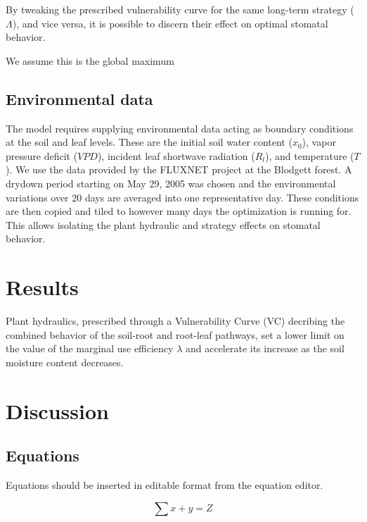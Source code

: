 \documentclass[utf8]{frontiersSCNS} %
\begin{document}
By tweaking the prescribed vulnerability curve for the same long-term strategy ($\Lambda$), and vice versa, it is possible to discern their effect on optimal stomatal behavior. 

We assume this is the global maximum

\subsection{Environmental data} 

The model requires supplying environmental data acting as boundary conditions at the soil and leaf levels. These are the initial soil water content ($x_0$), vapor pressure deficit ($VPD$), incident leaf shortwave radiation ($R_l$), and temperature ($T$). We use the data provided by the FLUXNET project at the Blodgett forest. A drydown period starting on May 29, 2005 was chosen and the environmental variations over 20 days are averaged into one representative day. These conditions are then copied and tiled to however many days the optimization is running for. This allows isolating the plant hydraulic and strategy effects on stomatal behavior.

\section{Results}

Plant hydraulics, prescribed through a Vulnerability Curve (VC) decribing the combined behavior of the soil-root and root-leaf pathways, set a lower limit on the value of the marginal use efficiency $\lambda$ and accelerate its increase as the soil moisture content decreases.

\section{Discussion}

\subsection{Equations}
Equations should be inserted in editable format from the equation editor.

\begin{equation}
\sum x+ y =Z\label{eq:01}
\end{equation}
\end{document}
